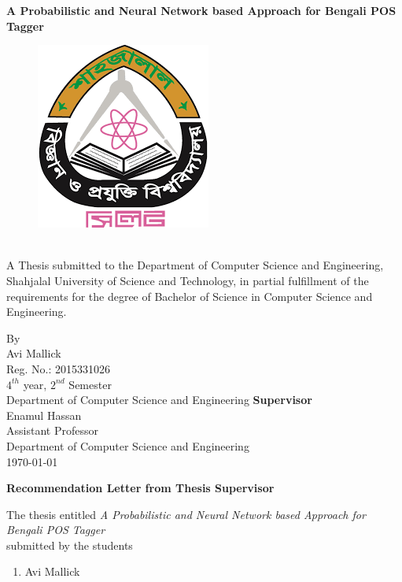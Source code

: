 \documentclass{standalone}
\begin{document}
\begin{titlepage}
\begin{center}
				\newpage
        {\Large \bf A Probabilistic and Neural Network based Approach for Bengali POS Tagger }
        \begin{figure}[h]
				\centering
				\includegraphics[scale=0.6]{./img/varsityLogo}
				\end{figure}\\
				A Thesis submitted to the
Department of Computer Science and Engineering,
Shahjalal University of Science and Technology, in partial fulfillment of the requirements for the degree of Bachelor of Science in Computer Science and Engineering.
       
				\vfill
				{\LARGE By}\\
       
        
     Avi Mallick\\
        Reg. No.: 2015331026\\ $4^{th}$ year, $2^{nd}$ Semester\\
				
			
				Department of Computer Science and Engineering
				\vfill
        {\bf Supervisor}\\
				Enamul Hassan \\
				Assistant Professor\\
				Department of Computer Science and Engineering\\
        \vfill
        \today
        \end{center}
				\newpage
				\begin{center}
					\textbf{\huge Recommendation Letter from Thesis Supervisor}
				\end{center}
				\noindent
				The thesis entitled \emph{A Probabilistic and Neural Network based Approach for Bengali POS Tagger}
				\\
				submitted by the students
				\begin{enumerate}
					\item Avi Mallick
					

\end{enumerate}
\end{titlepage}
\end{document}
